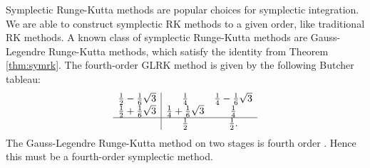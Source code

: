 


Symplectic Runge-Kutta methods are popular choices for symplectic integration.
We are able to construct symplectic RK methods to a given order, like traditional RK methods.
A known class of symplectic Runge-Kutta methods are Gauss-Legendre Runge-Kutta methods, which satisfy the identity from Theorem \ref{thm:symrk}.
The fourth-order GLRK method is given by the following Butcher tableau:
\begin{equation*}
	\begin{array}{c|cc}
		\frac{1}{2} - \frac{1}{6}\sqrt{3}  &\frac{1}{4} &\frac{1}{4} - \frac{1}{6}\sqrt{3} \\
		\frac{1}{2} + \frac{1}{6}\sqrt{3}  &\frac{1}{4} + \frac{1}{6}\sqrt{3} &\frac{1}{4} \\
		\hline
		&\frac{1}{2} &\frac{1}{2}.
	\end{array}
\end{equation*}
The Gauss-Legendre Runge-Kutta method on two stages is fourth order \cite{iserles2009rk}.
Hence this must be a fourth-order symplectic method.



